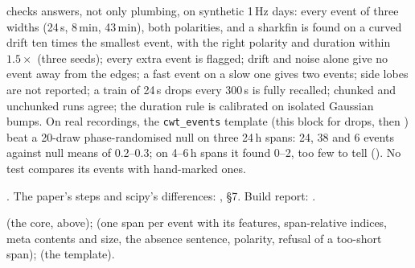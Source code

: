  checks answers, not only plumbing, on synthetic 1\,Hz days:
every event of three widths (24\,s, 8\,min, 43\,min), both polarities, and a sharkfin is found
on a curved drift ten times the smallest event, with the right polarity and duration within
$1.5\times$ (three seeds); every extra event is flagged; drift and noise alone give no event
away from the edges; a fast event on a slow one gives two events; side lobes are not reported;
a train of 24\,s drops every 300\,s is fully recalled; chunked and unchunked runs agree; the
duration rule is calibrated on isolated Gaussian bumps. On real recordings, the
\texttt{cwt\_events} template (this block for drops, then )
beat a 20-draw phase-randomised null on three 24\,h spans: 24, 38 and 6 events against null
means of 0.2--0.3; on 4--6\,h spans it found 0--2, too few to tell
(). No test compares its events with
hand-marked ones.

\citet{du2006improved}. The paper's steps and scipy's differences:
, \S7. Build report:
.

 (the core, above); 
(one span per event with its features, span-relative indices, meta contents and size, the
absence sentence, polarity, refusal of a too-short span); 
(the template).
